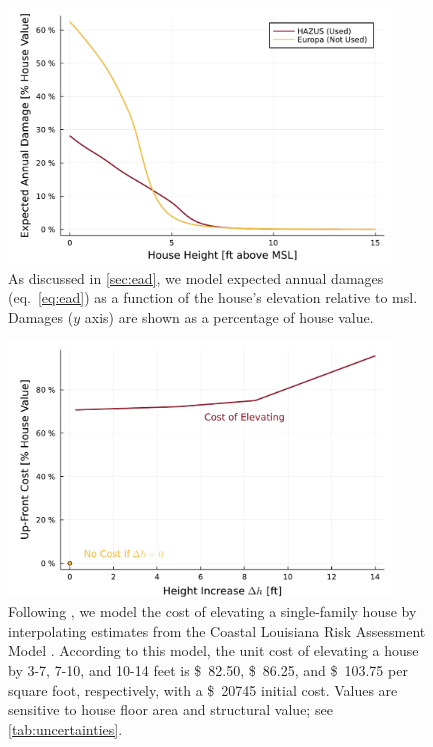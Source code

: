 \documentclass[12pt]{article}
\newcommand{\usd}[1]{\SI{#1}[\$]{}}
\begin{document}
\begin{figure}
    \centering
    \includegraphics[width=4in]{cost-expected-damage-emulator}
    \caption{
        As discussed in \cref{sec:ead}, we model expected annual damages (eq.~\ref{eq:ead}) as a function of the house's elevation relative to \gls{msl}.
        Damages ($y$ axis) are shown as a percentage of house value.
    }\label{fig:cost-expected-damage-emulator}
\end{figure}

\begin{figure}
    \centering
    \includegraphics[width=4in]{cost-up-front}
    \caption{
        Following \citet{zarekarizi_suboptimal:2020}, we model the cost of elevating a single-family house by interpolating estimates from the Coastal Louisiana Risk Assessment Model \citep{johnson_clara:2013}.
        According to this model, the unit cost of elevating a house by 3-7, 7-10, and 10-14 feet is \usd{82.50}, \usd{86.25}, and \usd{103.75} per square foot, respectively, with a \usd{20745} initial cost.
        Values are sensitive to house floor area and structural value; see \cref{tab:uncertainties}.
    }\label{fig:cost-up-front}
\end{figure}
\end{document}

